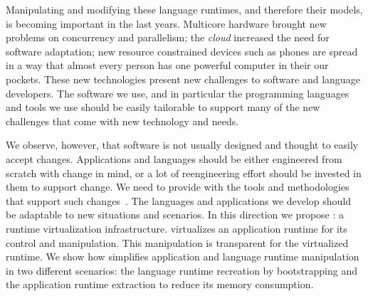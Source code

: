 Manipulating and modifying these language runtimes, and therefore their models, is becoming important in the last years. Multicore hardware brought new problems on concurrency and parallelism; the \emph{cloud} increased the need for software adaptation; new resource constrained devices such as phones are spread in a way that almost every person has one powerful computer in their our pockets. These new technologies present new challenges to software and language developers. The software we use, and in particular the programming languages and tools we use should be easily tailorable to support many of the new challenges that come with new technology and needs.

We observe, however, that software is not usually designed and thought to easily accept changes. Applications and languages should be either engineered from scratch with change in mind, or a lot of reengineering effort should be invested in them to support change. We need to provide with the tools and methodologies that support such changes~\cite{Nier08b}. The languages and applications we develop should be adaptable to new situations and scenarios. In this direction we propose \emph{\Vtt}: a runtime virtualization infrastructure. \Vtt virtualizes an application runtime for its control and manipulation. This manipulation is transparent for the virtualized runtime. We show how \Vtt simplifies application and language runtime manipulation in two different scenarios: the language runtime recreation by bootstrapping and the application runtime extraction to reduce its memory consumption.




